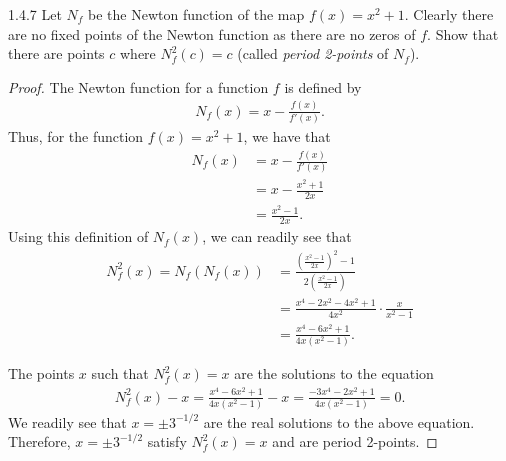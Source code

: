 \begin{problem}{1.4.7}
  Let $N_f$ be the Newton function of the map $f(x) = x^2 + 1$. Clearly there are no
  fixed points of the Newton function as there are no zeros of $f$. Show that there are
  points $c$ where $N_f^2 (c) = c$ (called \emph{period 2-points} of $N_f$).
\end{problem}

\begin{proof}
  The Newton function for a function $f$ is defined by
  \begin{align*}
    N_f(x) = x - \frac{f(x)}{f'(x)}.
  \end{align*}
  Thus, for the function $f(x) = x^2 + 1$,
  we have that
  \begin{align*}
    N_f(x) &= x - \frac{f(x)}{f'(x)}\\
    &= x - \frac{x^2 + 1}{2x} \\
    &= \frac{x^2 - 1}{2x}.
  \end{align*}
  Using this definition of $N_f(x)$, we can readily see that
  \begin{align*}
    N_f^2(x) = N_f(N_f(x))
    &= \frac{\left(\frac{x^2 - 1}{2x}\right)^2 - 1}{2\left(\frac{x^2 - 1}{2x}\right)} \\
    &= \frac{x^4-2x^2 - 4x^2 +1}{4x^2} \cdot \frac{x}{x^2-1} \\
    &= \frac{x^4 - 6x^2 +1}{4x(x^2 - 1)}.
  \end{align*}

  The points $x$ such that $N_f^2(x) = x$ are the solutions to the equation
  \begin{align*}
    N_f^2(x) - x = \frac{x^4 - 6x^2 +1}{4x(x^2 - 1)} - x = \frac{-3x^4-2x^2+1}{4x(x^2-1)} = 0.
  \end{align*}
  We readily see that $x = \pm 3^{-1/2}$ are the real solutions to the above equation.
  Therefore, $x = \pm 3^{-1/2}$ satisfy $N_f^2(x) = x$ and are period 2-points.
\end{proof}
\newpage

